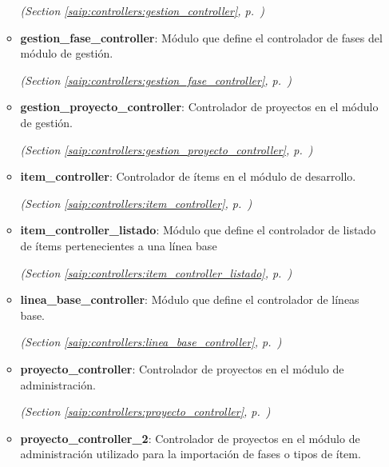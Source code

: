 \begin{itemize}
\begin{itemize}
  \textit{(Section \ref{saip:controllers:gestion_controller}, p.~\pageref{saip:controllers:gestion_controller})}

    \item \textbf{gestion\_fase\_controller}: Módulo que define el controlador de fases del módulo de gestión.



  \textit{(Section \ref{saip:controllers:gestion_fase_controller}, p.~\pageref{saip:controllers:gestion_fase_controller})}

    \item \textbf{gestion\_proyecto\_controller}: Controlador de proyectos en el módulo de gestión.



  \textit{(Section \ref{saip:controllers:gestion_proyecto_controller}, p.~\pageref{saip:controllers:gestion_proyecto_controller})}

    \item \textbf{item\_controller}: Controlador de ítems en el módulo de desarrollo.



  \textit{(Section \ref{saip:controllers:item_controller}, p.~\pageref{saip:controllers:item_controller})}

    \item \textbf{item\_controller\_listado}: Módulo que define el controlador de listado de ítems pertenecientes a una 
línea base



  \textit{(Section \ref{saip:controllers:item_controller_listado}, p.~\pageref{saip:controllers:item_controller_listado})}

    \item \textbf{linea\_base\_controller}: Módulo que define el controlador de líneas base.



  \textit{(Section \ref{saip:controllers:linea_base_controller}, p.~\pageref{saip:controllers:linea_base_controller})}

    \item \textbf{proyecto\_controller}: Controlador de proyectos en el módulo de administración.



  \textit{(Section \ref{saip:controllers:proyecto_controller}, p.~\pageref{saip:controllers:proyecto_controller})}

    \item \textbf{proyecto\_controller\_2}: Controlador de proyectos en el módulo de administración utilizado para la 
importación de fases o tipos de ítem.




\end{itemize}
\end{itemize}
